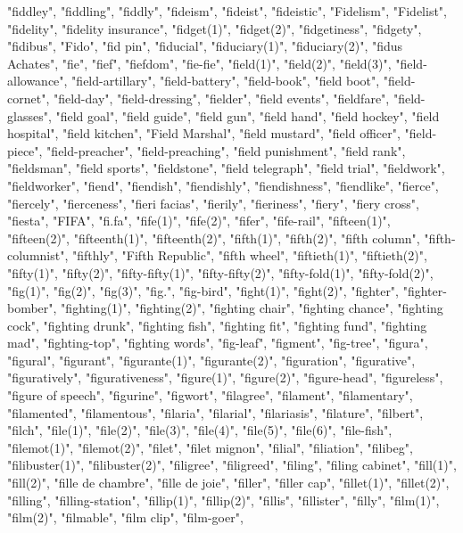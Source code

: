 "fiddley",
"fiddling",
"fiddly",
"fideism",
"fideist",
"fideistic",
"Fidelism",
"Fidelist",
"fidelity",
"fidelity insurance",
"fidget(1)",
"fidget(2)",
"fidgetiness",
"fidgety",
"fidibus",
"Fido",
"fid pin",
"fiducial",
"fiduciary(1)",
"fiduciary(2)",
"fidus Achates",
"fie",
"fief",
"fiefdom",
"fie-fie",
"field(1)",
"field(2)",
"field(3)",
"field-allowance",
"field-artillary",
"field-battery",
"field-book",
"field boot",
"field-cornet",
"field-day",
"field-dressing",
"fielder",
"field events",
"fieldfare",
"field-glasses",
"field goal",
"field guide",
"field gun",
"field hand",
"field hockey",
"field hospital",
"field kitchen",
"Field Marshal",
"field mustard",
"field officer",
"field-piece",
"field-preacher",
"field-preaching",
"field punishment",
"field rank",
"fieldsman",
"field sports",
"fieldstone",
"field telegraph",
"field trial",
"fieldwork",
"fieldworker",
"fiend",
"fiendish",
"fiendishly",
"fiendishness",
"fiendlike",
"fierce",
"fiercely",
"fierceness",
"fieri facias",
"fierily",
"fieriness",
"fiery",
"fiery cross",
"fiesta",
"FIFA",
"fi.fa",
"fife(1)",
"fife(2)",
"fifer",
"fife-rail",
"fifteen(1)",
"fifteen(2)",
"fifteenth(1)",
"fifteenth(2)",
"fifth(1)",
"fifth(2)",
"fifth column",
"fifth-columnist",
"fifthly",
"Fifth Republic",
"fifth wheel",
"fiftieth(1)",
"fiftieth(2)",
"fifty(1)",
"fifty(2)",
"fifty-fifty(1)",
"fifty-fifty(2)",
"fifty-fold(1)",
"fifty-fold(2)",
"fig(1)",
"fig(2)",
"fig(3)",
"fig.",
"fig-bird",
"fight(1)",
"fight(2)",
"fighter",
"fighter-bomber",
"fighting(1)",
"fighting(2)",
"fighting chair",
"fighting chance",
"fighting cock",
"fighting drunk",
"fighting fish",
"fighting fit",
"fighting fund",
"fighting mad",
"fighting-top",
"fighting words",
"fig-leaf",
"figment",
"fig-tree",
"figura",
"figural",
"figurant",
"figurante(1)",
"figurante(2)",
"figuration",
"figurative",
"figuratively",
"figurativeness",
"figure(1)",
"figure(2)",
"figure-head",
"figureless",
"figure of speech",
"figurine",
"figwort",
"filagree",
"filament",
"filamentary",
"filamented",
"filamentous",
"filaria",
"filarial",
"filariasis",
"filature",
"filbert",
"filch",
"file(1)",
"file(2)",
"file(3)",
"file(4)",
"file(5)",
"file(6)",
"file-fish",
"filemot(1)",
"filemot(2)",
"filet",
"filet mignon",
"filial",
"filiation",
"filibeg",
"filibuster(1)",
"filibuster(2)",
"filigree",
"filigreed",
"filing",
"filing cabinet",
"fill(1)",
"fill(2)",
"fille de chambre",
"fille de joie",
"filler",
"filler cap",
"fillet(1)",
"fillet(2)",
"filling",
"filling-station",
"fillip(1)",
"fillip(2)",
"fillis",
"fillister",
"filly",
"film(1)",
"film(2)",
"filmable",
"film clip",
"film-goer",
